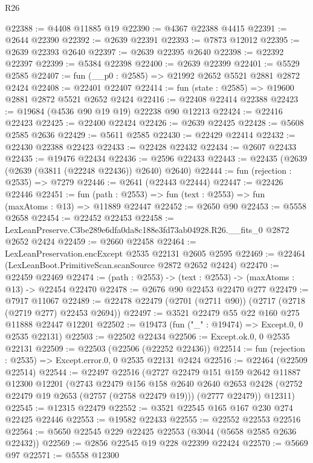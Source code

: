 \begin{lexlean}{R26}
\begin{coremodule}
@22388 := @4408 @11885 @19
@22390 := @4367 @22388 @4415
@22391 := @2644 @22390
@22392 := @2639 @22391
@22393 := @7873 @12012
@22395 := @2639 @22393 @2640
@22397 := @2639 @22395 @2640
@22398 := @22392 @22397
@22399 := @5384 @22398
@22400 := @2639 @22399
@22401 := @5529 @2585
@22407 := fun (__p0 : @2585) => @21992 @2652 @5521 @2881 @2872 @2424
@22408 := @22401 @22407
@22414 := fun (state : @2585) => @19600 @2881 @2872 @5521 @2652 @2424
@22416 := @22408 @22414 @22388
@22423 := @19684 (@4536 @90 @19 @19) @22238 @90 @12213
@22424 := @22416 @22423
@22425 := @22400 @22424
@22426 := @2639 @22425
@22428 := @5608 @2585 @2636
@22429 := @5611 @2585
@22430 := @22429 @22414
@22432 := @22430 @22388 @22423
@22433 := @22428 @22432
@22434 := @2607 @22433
@22435 := @19476 @22434
@22436 := @2596 @22433
@22443 := @22435 (@2639 (@2639 (@3811 (@22248 @22436)) @2640) @2640)
@22444 := fun (rejection : @2535) => @7279
@22446 := @2641 (@22443 @22444)
@22447 := @22426 @22446
@22451 := fun (path : @2553) => fun (text : @2553) => fun (maxAtoms : @13) => @11889 @22447
@22452 := @2650 @90
@22453 := @5558 @2658
@22454 := @22452 @22453
@22458 := LexLeanPreserve.C3be289e6dfa0da8c188e3fd73ab04928.R26.__fits_0 @2872 @2652 @2424
@22459 := @2660 @22458
@22464 := LexLeanPreservation.encExcept @2535 @22131 @2605 @2595
@22469 := @22464 (LexLeanBoot.PrimitiveScan.scanSource @2872 @2652 @2424)
@22470 := @22459 @22469
@22474 := (path : @2553) -> (text : @2553) -> (maxAtoms : @13) -> @22454 @22470
@22478 := @2676 @90 @22453 @22470 @277
@22479 := @7917 @11067
@22489 := @22478 @22479 (@2701 (@2711 @90)) (@2717 (@2718 (@2719 @277) @22453 @2694))
@22497 := @3521 @22479 @55 @22 @160 @275 @11888 @22447 @12201
@22502 := @19473 (fun ("_" : @19474) => Except.{0, 0} @2535 @22131)
@22503 := @22502 @22434
@22506 := Except.ok.{0, 0} @2535 @22131
@22509 := @22503 (@22506 (@22252 @22436))
@22514 := fun (rejection : @2535) => Except.error.{0, 0} @2535 @22131 @2424
@22516 := @22464 (@22509 @22514)
@22544 := @22497
    @22516
    (@2727
      @22479
      @151
      @159
      @2642
      @11887
      @12300
      @12201
      (@2743
        @22479
        @156
        @158
        @2640
        @2640
        @2653
        @2428
        (@2752 @22479 @19 @2653 (@2757 (@2758 @22479 @19)))
        (@2777 @22479))
      @12311)
@22545 := @12315 @22479
@22552 := @3521 @22545 @165 @167 @230 @274 @22425 @22446
@22553 := @19582 @22433
@22555 := @22552 @22553 @22516
@22564 := @5650 @22545 @229 @22425 @22553 (@3044 (@5658 @2585 @2636 @22432))
@22569 := @2856 @22545 @19 @228 @22399 @22424
@22570 := @5669 @97
@22571 := @5558 @12300

\end{coremodule}
\end{lexlean}
